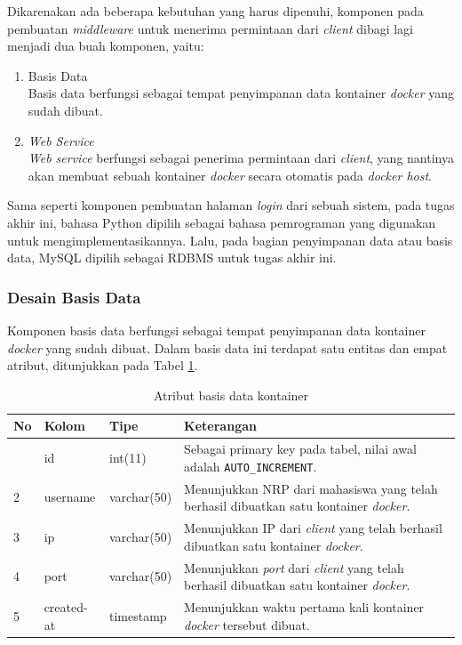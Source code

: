 Dikarenakan ada beberapa kebutuhan yang harus dipenuhi, komponen pada pembuatan \textit{middleware} untuk menerima permintaan dari \textit{client} dibagi lagi menjadi dua buah komponen, yaitu:

\begin{enumerate}
	\item Basis Data \\
	Basis data  berfungsi sebagai tempat penyimpanan data kontainer \textit{docker} yang sudah dibuat.
	\item \textit{Web Service} \\
	\textit{Web service} berfungsi sebagai penerima permintaan dari \textit{client}, yang nantinya akan membuat sebuah kontainer \textit{docker} secara otomatis pada \textit{docker host}.
\end{enumerate}

Sama seperti komponen pembuatan halaman \textit{login} dari sebuah sistem, pada tugas akhir ini, bahasa Python dipilih sebagai bahasa pemrograman yang digunakan untuk mengimplementasikannya. Lalu, pada bagian penyimpanan data atau basis data, MySQL dipilih sebagai RDBMS untuk tugas akhir ini. 

\subsubsection{Desain Basis Data}
Komponen basis data berfungsi sebagai tempat penyimpanan data kontainer \textit{docker} yang sudah dibuat. Dalam basis data ini terdapat satu entitas dan empat atribut, ditunjukkan pada Tabel \ref{tabelkontainer}.

\begin{longtable}{|p{}|p{}|p{}|p{}|}
	\caption{Atribut basis data kontainer} \label{tabelkontainer} \\
	\hline
	\textbf{No} & \textbf{Kolom} & \textbf{Tipe} & \textbf{Keterangan} \\ \hline
	\endhead
	\endfoot
	\endlastfoot
	1 & id & int(11) & Sebagai primary key pada tabel, nilai awal adalah \texttt{AUTO\_INCREMENT}. \\ \hline
	2 & username & varchar(50) & Menunjukkan NRP dari mahasiswa yang telah berhasil dibuatkan satu kontainer \textit{docker}. \\ \hline
	3 & ip & varchar(50) & Menunjukkan IP dari \textit{client} yang telah berhasil dibuatkan satu kontainer \textit{docker}. \\ \hline
	4 & port & varchar(50) & Menunjukkan \textit{port} dari \textit{client} yang telah berhasil dibuatkan satu kontainer \textit{docker}. \\ \hline
	5 & created-at & timestamp & Menunjukkan waktu pertama kali kontainer \textit{docker} tersebut dibuat. \\ \hline
	
\end{longtable}


